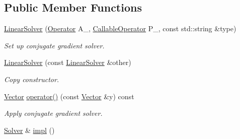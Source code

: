 \subsection*{Public Member Functions}
\begin{DoxyCompactItemize}
\item 
\hyperlink{classSpacy_1_1CG_1_1LinearSolver_a32f75ae5c449772649af6306b6f68497_a32f75ae5c449772649af6306b6f68497}{Linear\+Solver} (\hyperlink{group__SpacyGroup_ga3f89622eba80cf840b2a7102f1303455_ga3f89622eba80cf840b2a7102f1303455}{Operator} A\+\_\+, \hyperlink{group__SpacyGroup_ga2b74020d806ad800795cdd97dab3466f_ga2b74020d806ad800795cdd97dab3466f}{Callable\+Operator} P\+\_\+, const std\+::string \&type)
\begin{DoxyCompactList}\small\item\em Set up conjugate gradient solver. \end{DoxyCompactList}\item 
\hyperlink{classSpacy_1_1CG_1_1LinearSolver_a3c08d3c861d612d92168a350bc66c7dd_a3c08d3c861d612d92168a350bc66c7dd}{Linear\+Solver} (const \hyperlink{classSpacy_1_1CG_1_1LinearSolver}{Linear\+Solver} \&other)
\begin{DoxyCompactList}\small\item\em Copy constructor. \end{DoxyCompactList}\item 
\hyperlink{classSpacy_1_1Vector}{Vector} \hyperlink{classSpacy_1_1CG_1_1LinearSolver_a5ee58f9858d840621a44658ceb721850_a5ee58f9858d840621a44658ceb721850}{operator()} (const \hyperlink{classSpacy_1_1Vector}{Vector} \&y) const 
\begin{DoxyCompactList}\small\item\em Apply conjugate gradient solver. \end{DoxyCompactList}\item 
\hypertarget{classSpacy_1_1CG_1_1LinearSolver_aa0aa5fdfdfd66e186fc86c35d7b49df6}{}\hyperlink{classSpacy_1_1CG_1_1Solver}{Solver} \& \hyperlink{classSpacy_1_1CG_1_1LinearSolver_aa0aa5fdfdfd66e186fc86c35d7b49df6}{impl} ()\label{classSpacy_1_1CG_1_1LinearSolver_aa0aa5fdfdfd66e186fc86c35d7b49df6}


\end{DoxyCompactItemize}
